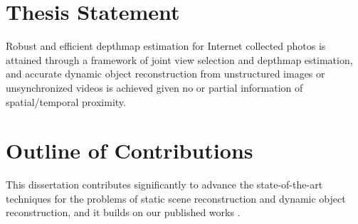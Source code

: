 \section{Thesis Statement}
Robust and efficient depthmap estimation for Internet collected photos is attained through a framework of joint view selection and depthmap estimation, and accurate dynamic object reconstruction from unstructured images or unsynchronized videos is achieved given no or partial information of spatial/temporal proximity.

\section{Outline of Contributions}
This dissertation contributes significantly to advance the state-of-the-art techniques for the problems of static scene reconstruction and dynamic object reconstruction, and it builds on our published works \cite{zheng2014patchmatch,zheng2014joint,zhengiccv_2015}.


